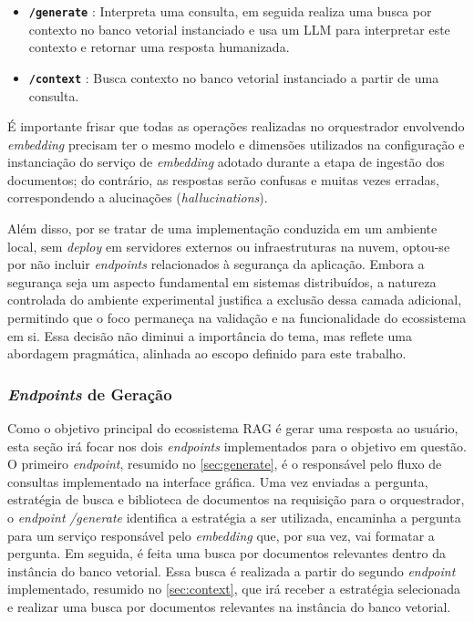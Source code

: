 \documentclass[a4paper, 12pt]{article}
\begin{document}
\begin{enumerate}
        \begin{itemize}
            \item \textbf{\texttt{/generate}} \label{sec:generate}: Interpreta uma consulta, em seguida realiza uma busca por contexto no banco vetorial instanciado e usa um LLM para interpretar este contexto e retornar uma resposta humanizada.
            \item \textbf{\texttt{/context}} \label{sec:context}: Busca contexto no banco vetorial instanciado a partir de uma consulta.
        \end{itemize}
    \end{enumerate}

    É importante frisar que todas as operações realizadas no orquestrador envolvendo \textit{embedding} precisam ter o mesmo modelo e dimensões utilizados na configuração e instanciação do serviço de \textit{embedding} adotado durante a etapa de ingestão dos documentos; do contrário, as respostas serão confusas e muitas vezes erradas, correspondendo a alucinações (\textit{hallucinations}).

    Além disso, por se tratar de uma implementação conduzida em um ambiente local, sem \textit{deploy} em servidores externos ou infraestruturas na nuvem, optou-se por não incluir \textit{endpoints} relacionados à segurança da aplicação. Embora a segurança seja um aspecto fundamental em sistemas distribuídos, a natureza controlada do ambiente experimental justifica a exclusão dessa camada adicional, permitindo que o foco permaneça na validação e na funcionalidade do ecossistema em si. Essa decisão não diminui a importância do tema, mas reflete uma abordagem pragmática, alinhada ao escopo definido para este trabalho.

    \subsubsection{\textit{Endpoints} de Geração}

    Como o objetivo principal do ecossistema RAG é gerar uma resposta ao usuário, esta seção irá focar nos dois \textit{endpoints} implementados para o objetivo em questão. O primeiro \textit{endpoint}, resumido no \autoref{sec:generate}, é o responsável pelo fluxo de consultas implementado na interface gráfica. Uma vez enviadas a pergunta, estratégia de busca e biblioteca de documentos na requisição para o orquestrador, o \textit{endpoint} \textit{/generate} identifica a estratégia a ser utilizada, encaminha a pergunta para um serviço responsável pelo \textit{embedding} que, por sua vez, vai formatar a pergunta. Em seguida, é feita uma busca por documentos relevantes dentro da instância do banco vetorial. Essa busca é realizada a partir do segundo \textit{endpoint} implementado, resumido no \autoref{sec:context}, que irá receber a estratégia selecionada e realizar uma busca por documentos relevantes na instância do banco vetorial.
\end{document}
